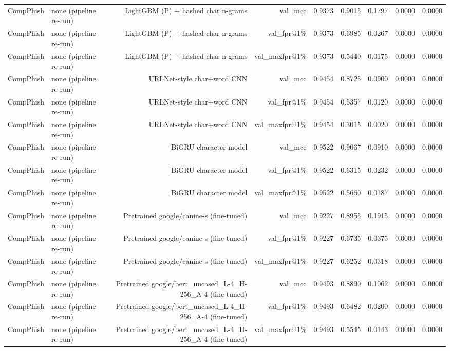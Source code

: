\begin{table}[t]
\begin{tabular}{llrrrrrrr}
CompPhish & none (pipeline re-run) & LightGBM (P) + hashed char n-grams & val\_mcc & 0.9373 & 0.9015 & 0.1797 & 0.0000 & 0.0000 \\
CompPhish & none (pipeline re-run) & LightGBM (P) + hashed char n-grams & val\_fpr@1\% & 0.9373 & 0.6985 & 0.0267 & 0.0000 & 0.0000 \\
CompPhish & none (pipeline re-run) & LightGBM (P) + hashed char n-grams & val\_maxfpr@1\% & 0.9373 & 0.5440 & 0.0175 & 0.0000 & 0.0000 \\
CompPhish & none (pipeline re-run) & URLNet-style char+word CNN & val\_mcc & 0.9454 & 0.8725 & 0.0900 & 0.0000 & 0.0000 \\
CompPhish & none (pipeline re-run) & URLNet-style char+word CNN & val\_fpr@1\% & 0.9454 & 0.5357 & 0.0120 & 0.0000 & 0.0000 \\
CompPhish & none (pipeline re-run) & URLNet-style char+word CNN & val\_maxfpr@1\% & 0.9454 & 0.3015 & 0.0020 & 0.0000 & 0.0000 \\
CompPhish & none (pipeline re-run) & BiGRU character model & val\_mcc & 0.9522 & 0.9067 & 0.0910 & 0.0000 & 0.0000 \\
CompPhish & none (pipeline re-run) & BiGRU character model & val\_fpr@1\% & 0.9522 & 0.6315 & 0.0232 & 0.0000 & 0.0000 \\
CompPhish & none (pipeline re-run) & BiGRU character model & val\_maxfpr@1\% & 0.9522 & 0.5660 & 0.0187 & 0.0000 & 0.0000 \\
CompPhish & none (pipeline re-run) & Pretrained google/canine-s (fine-tuned) & val\_mcc & 0.9227 & 0.8955 & 0.1915 & 0.0000 & 0.0000 \\
CompPhish & none (pipeline re-run) & Pretrained google/canine-s (fine-tuned) & val\_fpr@1\% & 0.9227 & 0.6735 & 0.0375 & 0.0000 & 0.0000 \\
CompPhish & none (pipeline re-run) & Pretrained google/canine-s (fine-tuned) & val\_maxfpr@1\% & 0.9227 & 0.6252 & 0.0318 & 0.0000 & 0.0000 \\
CompPhish & none (pipeline re-run) & Pretrained google/bert\_uncased\_L-4\_H-256\_A-4 (fine-tuned) & val\_mcc & 0.9493 & 0.8890 & 0.1062 & 0.0000 & 0.0000 \\
CompPhish & none (pipeline re-run) & Pretrained google/bert\_uncased\_L-4\_H-256\_A-4 (fine-tuned) & val\_fpr@1\% & 0.9493 & 0.6482 & 0.0200 & 0.0000 & 0.0000 \\
CompPhish & none (pipeline re-run) & Pretrained google/bert\_uncased\_L-4\_H-256\_A-4 (fine-tuned) & val\_maxfpr@1\% & 0.9493 & 0.5545 & 0.0143 & 0.0000 & 0.0000 \\

\end{tabular}
\end{table}

